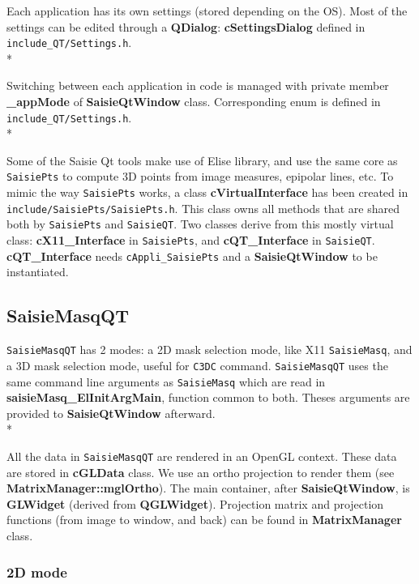 Each application has its own settings (stored depending on the OS). Most of the settings can be edited through a \textbf{QDialog}: \textbf{cSettingsDialog} defined in {\tt include\_QT/Settings.h}.\\*

Switching between each application in code is managed with private member \textbf{\_appMode} of \textbf{ SaisieQtWindow} class. Corresponding enum is defined in {\tt include\_QT/Settings.h}.\\*

Some of the Saisie Qt tools make use of Elise library, and use the same core as {\tt SaisiePts} to compute 3D points from image measures, epipolar lines, etc. To mimic the way {\tt SaisiePts} works, a class \textbf{cVirtualInterface} has been created in {\tt include/SaisiePts/SaisiePts.h}. This class owns all methods that are shared both by {\tt SaisiePts} and {\tt SaisieQT}. Two classes derive from this mostly virtual class: \textbf{cX11\_Interface} in {\tt SaisiePts}, and \textbf{cQT\_Interface} in {\tt SaisieQT}.\textbf{ cQT\_Interface} needs {\tt cAppli\_SaisiePts} and a \textbf{ SaisieQtWindow} to be instantiated.

\subsection{SaisieMasqQT}

{\tt SaisieMasqQT} has 2 modes: a 2D mask selection mode, like X11 {\tt SaisieMasq}, and a 3D mask selection mode, useful for {\tt C3DC} command. {\tt SaisieMasqQT} uses the same command line arguments as {\tt SaisieMasq} which are read in \textbf{saisieMasq\_ElInitArgMain}, function common to both. Theses arguments are provided to \textbf{SaisieQtWindow} afterward.\\*

All the data in {\tt SaisieMasqQT} are rendered in an OpenGL context. These data are stored in \textbf{ cGLData} class. We use an ortho projection to render them (see \textbf{MatrixManager::mglOrtho}). The main container, after \textbf{SaisieQtWindow}, is \textbf{GLWidget} (derived from \textbf{QGLWidget}). Projection matrix and projection functions (from image to window, and back) can be found in \textbf{ MatrixManager} class.

\subsubsection{2D mode}

